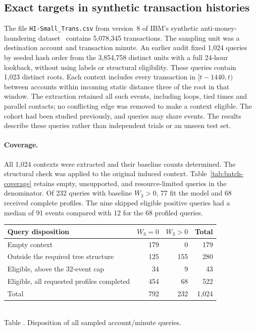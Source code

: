 \subsection{Exact targets in synthetic transaction histories}\label{sec:batch}

The file \texttt{HI-Small\_Trans.csv} from version~8 of IBM's synthetic
anti-money-laundering dataset~\citep{altman2023} contains 5,078,345 transactions.
The sampling unit was a destination
account and transaction minute. An earlier audit fixed 1,024 queries by
seeded hash order from the 3,854,758 distinct units with a full 24-hour
lookback, without using labels or structural eligibility. These queries
contain 1,023 distinct roots. Each context includes every transaction in
$[t-1440,t)$ between accounts within incoming static distance three of the
root in that window. The extraction retained all such events, including loops, tied
times and parallel contacts; no conflicting edge was removed to make a
context eligible. The cohort had been studied previously, and queries may
share events. The results describe these queries rather than independent
trials or an unseen test set.

\paragraph{Coverage.}
All 1,024 contexts were extracted and their baseline counts determined.
The structural check was applied to the original induced context.
Table~\ref{tab:batch-coverage} retains empty, unsupported, and
resource-limited queries in the denominator. Of 232 queries with
baseline $W_3>0$, 77 fit the model and 68 received complete profiles.
The nine skipped eligible positive queries had a median of 91 events
compared with 12 for the 68 profiled queries.

\begin{center}
\begin{tabular}{lrrr}
\toprule
Query disposition & $W_3=0$ & $W_3>0$ & Total\\
\midrule
Empty context & 179 & 0 & 179\\
Outside the required tree structure & 125 & 155 & 280\\
Eligible, above the 32-event cap & 34 & 9 & 43\\
Eligible, all requested profiles completed & 454 & 68 & 522\\
\midrule
Total & 792 & 232 & 1,024\\
\bottomrule
\end{tabular}
\label{tab:batch-coverage}\\[3pt]
{\small Table \thetable. Disposition of all sampled account/minute queries.}
\end{center}

